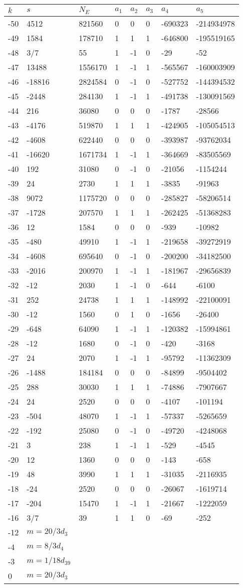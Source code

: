 \documentclass{amsart}
\begin{document}
\begin{longtable}{|l|l|l|lllll|}
\hline
$k$ & $s$ & $N_E$ & $a_1$ & $a_2$ & $a_3$ & $a_4$ & $a_5$\\
\hline
-50&4512&821560&0&0&0&-690323&-214934978\\
-49&1584&178710&1&1&1&-646800&-195519165\\
-48&3/7&55&1&-1&0&-29&-52\\
-47&13488&1556170&1&-1&1&-565567&-160003909\\
-46&-18816&2824584&0&-1&0&-527752&-144394532\\
-45&-2448&284130&1&-1&1&-491738&-130091569\\
-44&216&36080&0&0&0&-1787&-28566\\
-43&-4176&519870&1&1&1&-424905&-105054513\\
-42&-4608&622440&0&0&0&-393987&-93762034\\
-41&-16620&1671734&1&-1&1&-364669&-83505569\\
-40&192&31080&0&-1&0&-21056&-1154244\\
-39&24&2730&1&1&1&-3835&-91963\\
-38&9072&1175720&0&0&0&-285827&-58206514\\
-37&-1728&207570&1&1&1&-262425&-51368283\\
-36&12&1584&0&0&0&-939&-10982\\
-35&-480&49910&1&-1&1&-219658&-39272919\\
-34&-4608&695640&0&-1&0&-200200&-34182500\\
-33&-2016&200970&1&-1&1&-181967&-29656839\\
-32&-12&2030&1&-1&0&-644&-6100\\
-31&252&24738&1&1&1&-148992&-22100091\\
-30&-12&1560&0&1&0&-1656&-26400\\
-29&-648&64090&1&-1&1&-120382&-15994861\\
-28&-12&1680&0&-1&0&-420&-3168\\
-27&24&2070&1&-1&1&-95792&-11362309\\
-26&-1488&184184&0&0&0&-84899&-9504402\\
-25&288&30030&1&1&1&-74886&-7907667\\
-24&24&2520&0&0&0&-4107&-101194\\
-23&-504&48070&1&-1&1&-57337&-5265659\\
-22&-192&25080&0&-1&0&-49720&-4248068\\
-21&3&238&1&-1&1&-529&-4545\\
-20&12&1360&0&0&0&-143&-658\\
-19&48&3990&1&1&1&-31035&-2116935\\
-18&-24&2520&0&0&0&-26067&-1619714\\
-17&-204&15470&1&-1&1&-21667&-1222059\\
-16&3/7&39&1&1&0&-69&-252\\
-12&$m=20/3d_{3}$&&\multicolumn{5}{c|}{}\\
-4&$m=8/3d_{4}$&&\multicolumn{5}{c|}{}\\
-3&$m=1/18d_{39}$&&\multicolumn{5}{c|}{}\\
0&$m=20/3d_{3}$&&\multicolumn{5}{c|}{}\\
\hline
\end{longtable}
\end{document}

